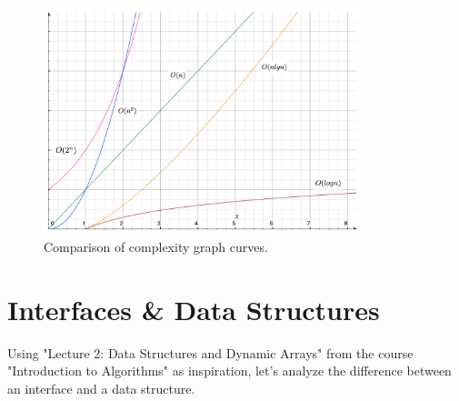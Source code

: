 \documentclass[a4paper,10pt]{article}
\begin{document}
\begin{figure}[ht]
\centering
\includegraphics[height=6.6cm]{figures/complexity_graph.png}
\caption{Comparison of complexity graph curves.}
\label{fig:complexity_graph}
\end{figure}


\section{Interfaces \& Data Structures}

Using "Lecture 2: Data Structures and Dynamic Arrays" from the course "Introduction to Algorithms" \cite{mit6006} as inspiration, let's analyze the difference between an interface and a data structure.
\\
\end{document}
